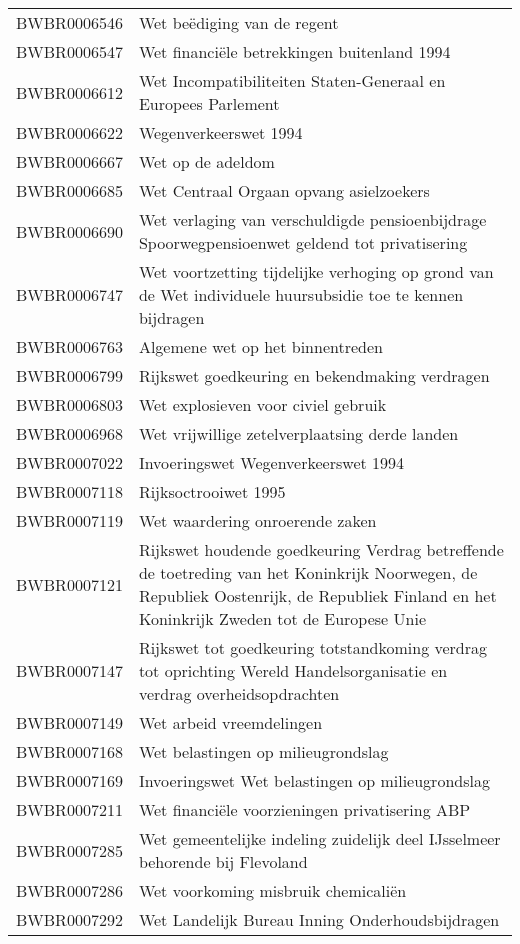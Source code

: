 \begin{longtable}{lp{}}
BWBR0006546 & Wet beëdiging van de regent \\
BWBR0006547 & Wet financiële betrekkingen buitenland 1994 \\
BWBR0006612 & Wet Incompatibiliteiten Staten-Generaal en Europees Parlement \\
BWBR0006622 & Wegenverkeerswet 1994 \\
BWBR0006667 & Wet op de adeldom \\
BWBR0006685 & Wet Centraal Orgaan opvang asielzoekers \\
BWBR0006690 & Wet verlaging van verschuldigde pensioenbijdrage Spoorwegpensioenwet geldend tot privatisering \\
BWBR0006747 & Wet voortzetting tijdelijke verhoging op grond van de Wet individuele huursubsidie toe te kennen bijdragen \\
BWBR0006763 & Algemene wet op het binnentreden \\
BWBR0006799 & Rijkswet goedkeuring en bekendmaking verdragen \\
BWBR0006803 & Wet explosieven voor civiel gebruik \\
BWBR0006968 & Wet vrijwillige zetelverplaatsing derde landen \\
BWBR0007022 & Invoeringswet Wegenverkeerswet 1994 \\
BWBR0007118 & Rijksoctrooiwet 1995 \\
BWBR0007119 & Wet waardering onroerende zaken \\
BWBR0007121 & Rijkswet houdende goedkeuring Verdrag betreffende de toetreding van het Koninkrijk Noorwegen, de Republiek Oostenrijk, de Republiek Finland en het Koninkrijk Zweden tot de Europese Unie \\
BWBR0007147 & Rijkswet tot goedkeuring totstandkoming verdrag tot oprichting Wereld Handelsorganisatie en verdrag overheidsopdrachten \\
BWBR0007149 & Wet arbeid vreemdelingen \\
BWBR0007168 & Wet belastingen op milieugrondslag \\
BWBR0007169 & Invoeringswet Wet belastingen op milieugrondslag \\
BWBR0007211 & Wet financiële voorzieningen privatisering ABP \\
BWBR0007285 & Wet gemeentelijke indeling zuidelijk deel IJsselmeer behorende bij Flevoland \\
BWBR0007286 & Wet voorkoming misbruik chemicaliën \\
BWBR0007292 & Wet Landelijk Bureau Inning Onderhoudsbijdragen \\

\end{longtable}
